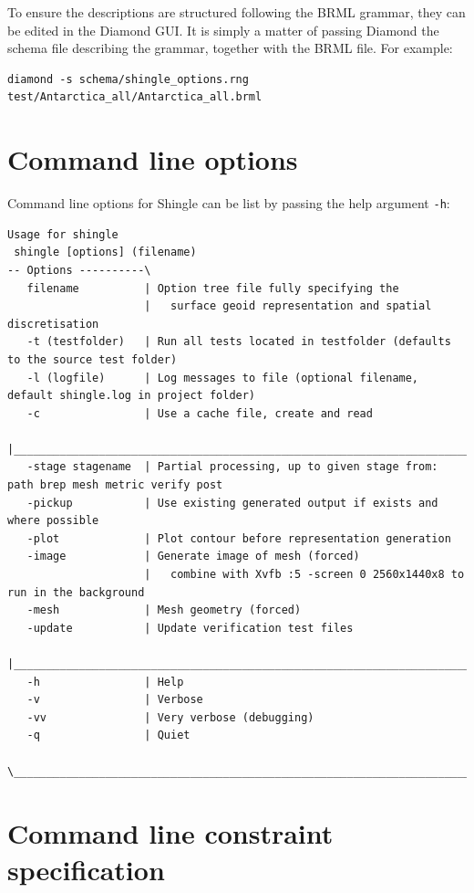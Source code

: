 \documentclass[a4paper, 10pt]{book}
\providecommand{\shingle}{Shingle\xspace}
\providecommand{\brml}{BRML\xspace}
\begin{document}
To ensure the descriptions are structured following the \brml grammar, they can be edited in the Diamond GUI.
It is simply a matter of passing Diamond the schema file describing the grammar, together with the \brml file.
For example:
\begin{verbatim}
diamond -s schema/shingle_options.rng test/Antarctica_all/Antarctica_all.brml 
\end{verbatim}






\clearpage
\section{Command line options}

Command line options for \shingle can be list by passing the help argument \verb+-h+:

\begin{Verbatim}[fontsize=\scriptsize]
Usage for shingle
 shingle [options] (filename)
-- Options ----------\ 
   filename          | Option tree file fully specifying the
                     |   surface geoid representation and spatial discretisation
   -t (testfolder)   | Run all tests located in testfolder (defaults to the source test folder)
   -l (logfile)      | Log messages to file (optional filename, default shingle.log in project folder)
   -c                | Use a cache file, create and read
                     |________________________________________________________________________________
   -stage stagename  | Partial processing, up to given stage from: path brep mesh metric verify post
   -pickup           | Use existing generated output if exists and where possible
   -plot             | Plot contour before representation generation 
   -image            | Generate image of mesh (forced)
                     |   combine with Xvfb :5 -screen 0 2560x1440x8 to run in the background
   -mesh             | Mesh geometry (forced)
   -update           | Update verification test files
                     |________________________________________________________________________________
   -h                | Help
   -v                | Verbose
   -vv               | Very verbose (debugging)
   -q                | Quiet
                     \________________________________________________________________________________
\end{Verbatim}

\section{Command line constraint specification}
\end{document}
